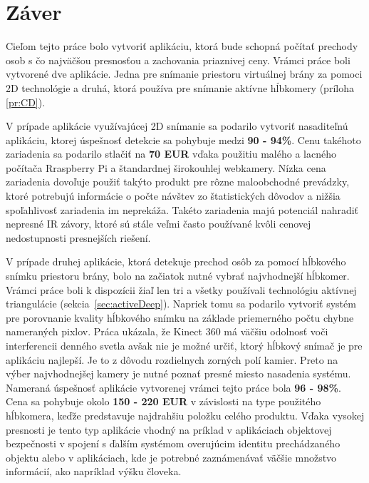 
\chapter{Záver}
Cieľom tejto práce bolo vytvoriť aplikáciu, ktorá bude schopná počítať prechody osob s čo najväčšou presnosťou a zachovania priaznivej ceny. Vrámci práce boli vytvorené dve aplikácie. Jedna pre snímanie priestoru virtuálnej brány za pomoci 2D technológie a druhá, ktorá používa pre snímanie aktívne hĺbkomery (príloha \ref{pr:CD}).

V prípade aplikácie využívajúcej 2D snímanie sa podarilo vytvoriť nasaditeľnú aplikáciu, ktorej úspešnosť detekcie sa pohybuje medzi \textbf{90 - 94\%}. Cenu takéhoto zariadenia sa podarilo stlačiť na \textbf{70 EUR} vďaka použitiu malého a lacného počítača Rraspberry Pi a štandardnej širokouhlej webkamery. Nízka cena zariadenia dovoľuje použiť takýto produkt pre rôzne maloobchodné prevádzky, ktoré potrebujú informácie o počte návštev zo štatistických dôvodov a nižšia spoľahlivosť zariadenia im neprekáža. Takéto zariadenia majú potenciál nahradiť nepresné IR závory, ktoré sú stále veľmi často používané kvôli cenovej nedostupnosti presnejších riešení.

V prípade druhej aplikácie, ktorá detekuje prechod osôb za pomocí hĺbkového snímku priestoru brány, bolo na začiatok nutné vybrať najvhodnejší hĺbkomer. Vrámci práce boli k dispozícii žiaľ len tri a všetky používali technológiu aktívnej triangulácie (sekcia~\ref{sec:activeDeep}). Napriek tomu sa podarilo vytvoriť systém pre porovnanie kvality hĺbkového snímku na základe priemerného počtu chybne nameraných pixlov. Práca ukázala, že Kinect 360 má väčšiu odolnosť voči interferencii denného svetla avšak nie je možné určiť, ktorý hĺbkový snímač je pre aplikáciu najlepší. Je to z dôvodu rozdielnych zorných polí kamier. Preto na výber najvhodnejšej kamery je nutné poznať presné miesto nasadenia systému. Nameraná úspešnosť aplikácie vytvorenej vrámci tejto práce bola \textbf{96 - 98\%}. Cena sa pohybuje okolo \textbf{150 - 220 EUR} v závislosti na type použitého hĺbkomera, keďže predstavuje najdrahšiu položku celého produktu. Vďaka vysokej presnosti je tento typ aplikácie vhodný na príklad v aplikáciach objektovej bezpečnosti v spojení s ďalším systémom overujúcim identitu prechádzaného objektu alebo v aplikáciach, kde je potrebné zaznámenávať väčšie množstvo informácií, ako napríklad výšku človeka.

